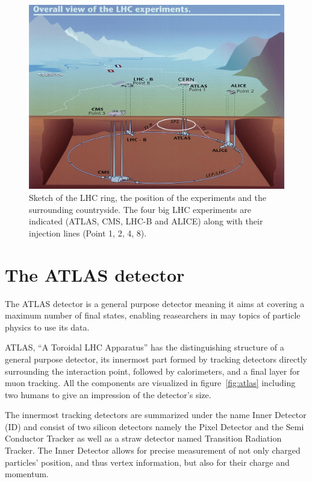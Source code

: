 \begin{figure}[htbp]
  \centering
  \includegraphics[scale=0.4]{figures_LHC/CERN-all-experiments.jpg}
  \caption[Sketch of the LHC ring.]{Sketch of the LHC ring, the position
    of the experiments and the surrounding countryside. The four big
    LHC experiments are indicated (ATLAS, CMS, LHC-B and ALICE) along with their injection lines (Point 1, 2, 4, 8).~\cite{Jean-Luc:841555}}
  \label{fig:LHC}
\end{figure}


\section{The ATLAS detector}

The ATLAS detector is a general purpose detector meaning it aims at covering a maximum number of final states, enabling reasearchers in may topics of particle physics to use its data.

ATLAS, \enquote{A Toroidal LHC Apparatus} has the distinguishing structure of a general purpose detector, its innermost part formed by tracking detectors directly surrounding the interaction point, followed by calorimeters, and a final layer for muon tracking. All the components are visualized in figure~\ref{fig:atlas} including two humans to give an impression of the detector's size.

The innermost tracking detectors are summarized under the name Inner Detector (ID) and consist of two silicon detectors namely the Pixel Detector and the Semi Conductor Tracker as well as a straw detector named Transition Radiation Tracker. The Inner Detector allows for precise measurement of not only charged particles' position, and thus vertex information, but also for their charge and momentum.

